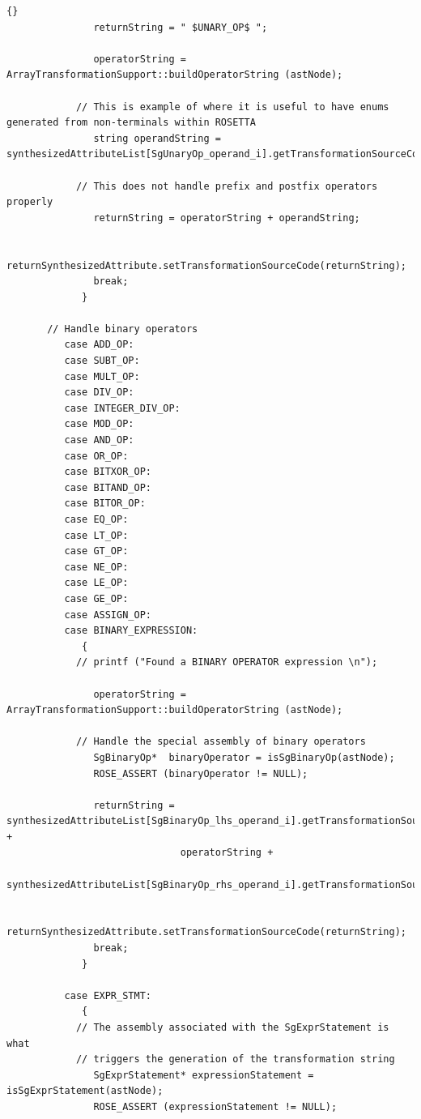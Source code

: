 \documentclass[10pt]{article}
\begin{document}
{\begin{lstlisting}{}
               returnString = " $UNARY_OP$ ";

               operatorString = ArrayTransformationSupport::buildOperatorString (astNode);

            // This is example of where it is useful to have enums generated from non-terminals within ROSETTA
               string operandString = synthesizedAttributeList[SgUnaryOp_operand_i].getTransformationSourceCode();

            // This does not handle prefix and postfix operators properly
               returnString = operatorString + operandString;

               returnSynthesizedAttribute.setTransformationSourceCode(returnString);
               break;
             }

       // Handle binary operators
          case ADD_OP:
          case SUBT_OP:
          case MULT_OP:
          case DIV_OP:
          case INTEGER_DIV_OP:
          case MOD_OP:
          case AND_OP:
          case OR_OP:
          case BITXOR_OP:
          case BITAND_OP:
          case BITOR_OP:
          case EQ_OP:
          case LT_OP:
          case GT_OP:
          case NE_OP:
          case LE_OP:
          case GE_OP:
          case ASSIGN_OP:
          case BINARY_EXPRESSION:
             {
            // printf ("Found a BINARY OPERATOR expression \n");

               operatorString = ArrayTransformationSupport::buildOperatorString (astNode);

            // Handle the special assembly of binary operators
               SgBinaryOp*  binaryOperator = isSgBinaryOp(astNode);
               ROSE_ASSERT (binaryOperator != NULL);

               returnString = synthesizedAttributeList[SgBinaryOp_lhs_operand_i].getTransformationSourceCode() +
                              operatorString +
                              synthesizedAttributeList[SgBinaryOp_rhs_operand_i].getTransformationSourceCode();

               returnSynthesizedAttribute.setTransformationSourceCode(returnString);
               break;
             }

          case EXPR_STMT:
             {
            // The assembly associated with the SgExprStatement is what 
            // triggers the generation of the transformation string
               SgExprStatement* expressionStatement = isSgExprStatement(astNode);
               ROSE_ASSERT (expressionStatement != NULL);


\end{lstlisting}}
\end{document}
